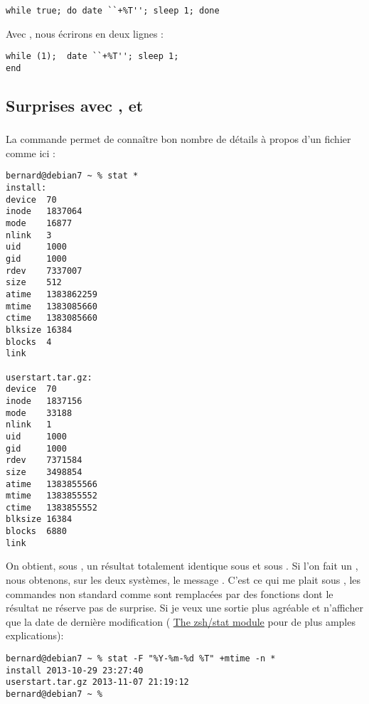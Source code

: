 \begin{lstlisting}[caption=une boucle while]
while true; do date ``+%T''; sleep 1; done
\end{lstlisting}

Avec \tcsh{}, nous écrirons en deux lignes :
\begin{lstlisting}[caption=la même pour tcsh]
while (1);  date ``+%T''; sleep 1;
end
\end{lstlisting}

\subsection{Surprises avec ,  et }

\subsubsection{}
La commande  permet de connaître bon nombre de détails à propos d'un fichier comme ici :

\begin{lstlisting}[caption=la commande stat depuis zsh]
bernard@debian7 ~ % stat *
install:
device  70
inode   1837064
mode    16877
nlink   3
uid     1000
gid     1000
rdev    7337007
size    512
atime   1383862259
mtime   1383085660
ctime   1383085660
blksize 16384
blocks  4
link

userstart.tar.gz:
device  70
inode   1837156
mode    33188
nlink   1
uid     1000
gid     1000
rdev    7371584
size    3498854
atime   1383855566
mtime   1383855552
ctime   1383855552
blksize 16384
blocks  6880
link
\end{lstlisting}

On obtient, sous \zsh{}, un résultat totalement identique sous \netbsd{} et sous \linux{}.  Si l'on fait un , nous obtenons, sur les deux systèmes, le message . C'est ce qui me plait sous \zsh{}, les commandes non standard comme  sont remplacées par des fonctions dont le résultat ne réserve pas de surprise.  Si je veux une sortie plus agréable et n'afficher que la date de dernière modification (\cf{} \href{http://zsh.sourceforge.net/Doc/Release/Zsh-Modules.html#The-zsh_002fstat-Module}{The zsh/stat module} pour de plus amples explications):

\begin{lstlisting}[caption=stat depuis zsh sous Debian]
bernard@debian7 ~ % stat -F "%Y-%m-%d %T" +mtime -n *
install 2013-10-29 23:27:40
userstart.tar.gz 2013-11-07 21:19:12
bernard@debian7 ~ %
\end{lstlisting}

